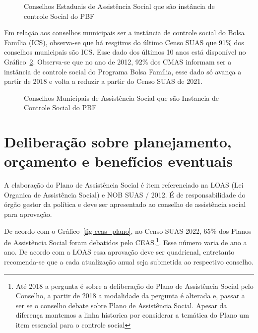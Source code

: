 \documentclass[
  letterpaper,
  DIV=11,
  numbers=noendperiod]{scrreprt}
\begin{document}
\begin{figure}


\caption{\label{fig-ceas_icspbf2}Conselhos Estaduais de Assistência
Social que são instância de controle Social do PBF}

\end{figure}%

Em relação aos conselhos municipais ser a instância de controle social
do Bolsa Família (ICS), observa-se que há resgitros do último Censo SUAS
que 91\% dos conselhos municipais são ICS. Esse dado dos últimos 10 anos
está disponível no Gráfico~\ref{fig-cmas_icspbf}. Observa-se que no ano
de 2012, 92\% dos CMAS informam ser a instância de controle social do
Programa Bolsa Família, esse dado só avança a partir de 2018 e volta a
reduzir a partir do Censo SUAS de 2021.

\begin{figure}


\caption{\label{fig-cmas_icspbf}Conselhos Municipais de Assistência
Social que são Instancia de Controle Social do PBF}

\end{figure}%

\section{Deliberação sobre planejamento, orçamento e benefícios
eventuais}\label{deliberauxe7uxe3o-sobre-planejamento-oruxe7amento-e-benefuxedcios-eventuais}

A elaboração do Plano de Assistência Social é item referenciado na LOAS
(Lei Organica de Assistência Social) e NOB SUAS / 2012. É de
responsabilidade do órgão gestor da política e deve ser apresentado ao
conselho de assistência social para aprovação.

De acordo com o Gráfico~\ref{fig-ceas_plano}, no Censo SUAS 2022, 65\%
dos Planos de Assistência Social foram debatidos pelo CEAS.\footnote{Até
  2018 a pergunta é sobre a deliberação do Plano de Assistência Social
  pelo Conselho, a partir de 2018 a modalidade da pergunta é alterada e,
  passar a ser se o conselho debate sobre Plano de Assistência Social.
  Apesar da diferença mantemos a linha historica por considerar a
  temática do Plano um item essencial para o controle social}. Esse
número varia de ano a ano. De acordo com a LOAS essa aprovação deve ser
quadrienal, entretanto recomenda-se que a cada atualização anual seja
submetida ao respectivo conselho.
\end{document}
